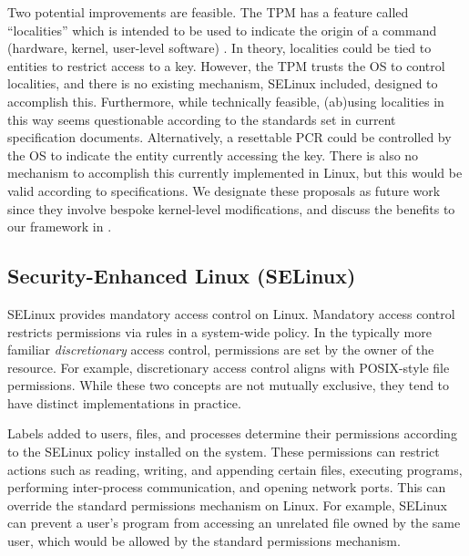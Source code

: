 \documentclass[12pt,letterpaper]{kuthesis}
\newif\ifthesis
\begin{document}
Two potential improvements are feasible.
The TPM has a feature called ``localities'' which is intended to be used to indicate the origin of a command (hardware, kernel, user-level software) \cite{Trusted-Computing-Group:2023:TCG-PC-Client-PFP,Arthur:2015:A-Practical-Guide-to-TPM-2.0-Certifying-Keys}.
In theory, localities could be tied to entities to restrict access to a key.
However, the TPM trusts the OS to control localities, and there is no existing mechanism, SELinux included, designed to accomplish this.
Furthermore, while technically feasible, (ab)using localities in this way seems questionable according to the standards set in current specification documents.
Alternatively, a resettable PCR could be controlled by the OS to indicate the entity currently accessing the key.
There is also no mechanism to accomplish this currently implemented in Linux, but this would be valid according to specifications.
We designate these proposals as future work since they involve bespoke kernel-level modifications, and discuss the benefits to our framework in .

\subsection{Security-Enhanced Linux (SELinux)}
SELinux \cite{Loscocco:2001:SELinux} provides mandatory access control on Linux.
Mandatory access control restricts permissions via rules in a system-wide policy.
In the typically more familiar \emph{discretionary} access control, permissions are set by the owner of the resource.
For example, discretionary access control aligns with POSIX-style file permissions.
While these two concepts are not mutually exclusive, they tend to have distinct implementations in practice.

Labels added to users, files, and processes determine their permissions according to the SELinux policy installed on the system.
These permissions can restrict actions such as reading, writing, and appending certain files,
executing programs, performing inter-process communi\-cation, and opening network ports.
This can override the standard permissions mechanism on Linux.
For example, SELinux can prevent a user's program from accessing an unrelated file owned by the same user,
which would be allowed by the standard permissions mechanism.

\ifthesis\subsection{Complexity of SELinux Policy}\fi
\end{document}
